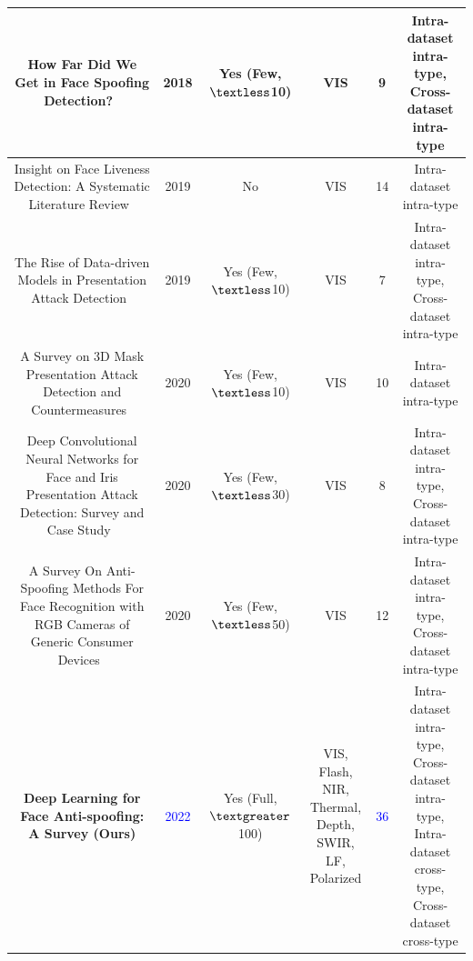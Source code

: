 \documentclass[10pt,journal,compsoc]{IEEEtran}
\begin{document}
\begin{table}
{\begin{tabular}{c c c c c c}
  \midrule
 How Far Did We Get in Face Spoofing Detection?~\cite{souza2018far} & 2018 & \tabincell{c}{Yes\\(Few, $\textless$10)} & VIS  & 9 & \tabincell{c}{Intra-dataset intra-type,\\Cross-dataset intra-type}\\

  \midrule
 Insight on Face Liveness Detection: A Systematic Literature Review~\cite{raheem2019insight} & 2019 & No & VIS  & 14 & Intra-dataset intra-type\\

  \midrule
 The Rise of Data-driven Models in Presentation Attack Detection~\cite{pereira2020rise} & 2019 & \tabincell{c}{Yes\\(Few, $\textless$10)} & VIS  & 7 & \tabincell{c}{Intra-dataset intra-type,\\Cross-dataset intra-type}\\ 

  \midrule
 A Survey on 3D Mask Presentation Attack Detection and Countermeasures~\cite{jia2020survey} & 2020 & \tabincell{c}{Yes\\(Few, $\textless$10)} & VIS  & 10 & Intra-dataset intra-type\\

  \midrule
 \tabincell{c}{Deep Convolutional Neural Networks for Face and Iris Presentation Attack \\Detection: Survey and Case Study}~\cite{el2020deep} & 2020 & \tabincell{c}{Yes\\(Few, $\textless$30)} & VIS  & 8 & \tabincell{c}{Intra-dataset intra-type,\\Cross-dataset intra-type}\\ 


 \midrule
 \tabincell{c}{A Survey On Anti-Spoofing Methods For Face Recognition with\\ RGB Cameras of Generic Consumer Devices}~\cite{ming2020survey} & 2020 & \tabincell{c}{Yes\\(Few, $\textless$50)} & VIS  & 12 & \tabincell{c}{Intra-dataset intra-type,\\Cross-dataset intra-type}\\ 


  \midrule
 \textbf{Deep Learning for Face Anti-spoofing: A Survey (Ours)} & \textcolor{blue}{2022} & \tabincell{c}{Yes\\(Full, $\textgreater$100)} & \tabincell{c}{VIS, Flash,\\NIR, Thermal, \\Depth, SWIR, \\LF, Polarized}  & \textcolor{blue}{36} & \tabincell{c}{Intra-dataset intra-type,\\Cross-dataset intra-type,\\Intra-dataset cross-type,\\Cross-dataset cross-type}\\ 

 \bottomrule[1pt]
 \end{tabular}}
\end{table}
\end{document}
